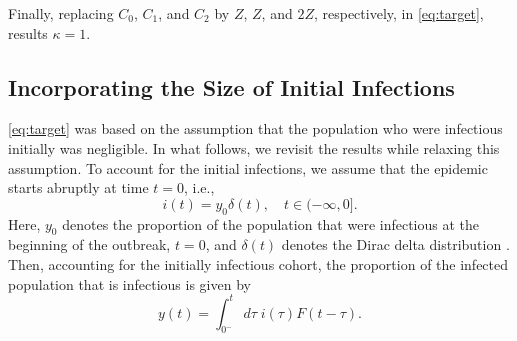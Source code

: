 Finally, replacing $C_0$, $C_1$, and $C_2$ by $Z$, $Z$, and $2Z$, respectively, in \autoref{eq:target}, results $\kappa = 1$.

\subsection{Incorporating the Size of Initial Infections}\label{sec_initial_y0}
 \autoref{eq:target} 
was based on the assumption that the population who were infectious initially  was negligible.
In what follows, we revisit the results while relaxing this assumption.
 To account for the initial infections, we assume that the epidemic starts abruptly at time $t=0$, i.e.,
 \begin{equation} \label{eq_incidence_dirac}
 	i(t)=y_0\delta(t), \quad t\in(-\infty,0].
 \end{equation}
Here, $y_0$ denotes the proportion of the population that were infectious at the beginning of the outbreak,  $ t = 0$, and $\delta(t)$ denotes the Dirac delta distribution \cite{Champredon2018}.
 Then, accounting for the initially infectious cohort, the proportion of the infected population that is infectious is given by
$$
y(t) = \int_{0^-}^t d\tau\; i(\tau)F(t-\tau).
$$

